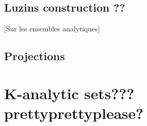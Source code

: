 \documentclass[10pt, a4paper, titlepage]{article}
\numberwithin{equation}{section}
\begin{document}
\subsection{Luzins construction ??}
[Sur les ensembles analytiques]




 \subsection{Projections}



\section{K-analytic sets??? prettyprettyplease?}
































\vspace{\fill}
\printbibliography{}
\end{document}
